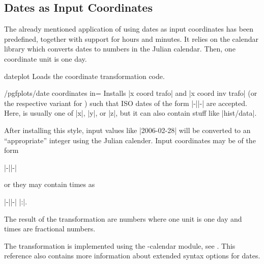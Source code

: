 \subsection{Dates as Input Coordinates}
\label{sec:pgfplots:date:coords}

{
\def\pgfplotsmanualcurlibrary{dateplot}

The already mentioned application of using dates as input coordinates has been
predefined, together with support for hours and minutes. It relies on the
\pgfname{} calendar library which converts dates to numbers in the Julian
calendar. Then, one coordinate unit is one day.

\begin{pgfplotslibrary}{dateplot}
    Loads the coordinate transformation code.
\end{pgfplotslibrary}

\begin{stylekey}{/pgfplots/date coordinates in=}
    Installs |x coord trafo| and |x coord inv trafo| (or the respective variant
    for ) such that ISO dates of the form
    |-||-| are accepted. Here,
     is usually one of |x|, |y|, or |z|, but it can also
    contain stuff like |hist/data|.

    After installing this style, input values like |2006-02-28| will be
    converted to an ``appropriate'' integer using the Julian calender. Input
    coordinates may be of the form

        |-||-|

    \noindent or they may contain times as

        |-||-| |:|.

    The result of the transformation are numbers where one unit is one day and
    times are fractional numbers.

    The transformation is implemented using the \pgfname-calendar module, see
    \cite[Calendar Library]{tikz}. This reference also contains more
    information about extended syntax options for dates.


\end{stylekey}}
